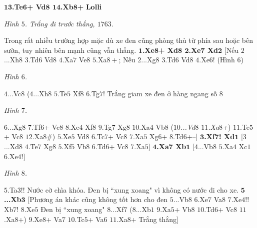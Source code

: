 \begin{multicols}{2}
	\vskip 0.1cm
	\textbf{\color{gocco}$\pmb{13}$.Te$\pmb{6}$+ Vd$\pmb{8}$ $\pmb{14}$.Xb$\pmb{8}$+}
	\vskip 0.1cm
	\textbf{\color{gocco}Lolli}
	\begin{center}
		\newgame
		\scalebox{0.85}\showboard
		\vskip 0.1cm
		\textit{\small\color{gocco}Hình $5$. Trắng đi trước thắng, $1763$.}
	\end{center}
	Trong rất nhiều trường hợp mặc dù xe đen cũng phòng thủ từ phía sau hoặc bên sườn, tuy nhiên bên mạnh cũng vẫn thắng.
	\vskip 0.1cm
	\textbf{\color{gocco}$\pmb{1}$.Xe$\pmb{8}$+ Xd$\pmb{8}$ $\pmb{2}$.Xe$\pmb{7}$ Xd$\pmb{2}$} [Nếu $2$...Xh$8$ $3$.Td$6$ Vd$8$ $4$.Xa$7$ Ve$8$ $5$.Xa$8+$; Nếu $2$...Xg$8$ $3$.Td$6$ Vd$8$ $4$.Xe$6$! (Hình $6$)
	\begin{center}
		\newgame
		\scalebox{0.85}\showboard
		\vskip 0.1cm
		\textit{\small\color{gocco}Hình $6$.}
	\end{center}
	$4$...Vc$8$ ($4$...Xh$8$ $5$.Te$5$ Xf$8$ $6$.Tg$7$! Trắng giam xe đen ở hàng ngang số $8$
	\begin{center}
		\newgame
		\scalebox{0.85}\showboard
		\vskip 0.1cm
		\textit{\small\color{gocco}Hình $7$.}
	\end{center}
	$6$...Xg$8$ $7$.Tf$6$+ Vc$8$ $8$.Xe$4$ Xf$8$ $9$.Tg$7$ Xg$8$ $10$.Xa$4$ Vb$8$ (\textit{$10$...Vd$8$ $11$.Xa$8$+}) $11$.Te$5$+ Vc$8$ $12$.Xa$8\#$) $5$.Xe$5$ Vd$8$ $6$.Tc$7$+ Vc$8$ $7$.Xa$5$ Xg$6$+ $8$.Td$6$+–]
	\vskip 0.1cm
	\textbf{\color{gocco}$\pmb{3}$.Xf$\pmb{7}$! Xd$\pmb{1}$} [$3$...Xd$8$ $4$.Te$7$ Xg$8$ $5$.Xf$5$ Vb$8$ $6$.Td$6$+ Vc$8$ $7$.Xa$5$]
	\vskip 0.1cm
	\textbf{\color{gocco}$\pmb{4}$.Xa$\pmb{7}$ Xb$\pmb{1}$} [$4$...Vb$8$ $5$.Xa$4$ Xc$1$ $6$.Xe$4$!]
	\begin{center}
		\newgame
		\scalebox{0.85}\showboard
		\vskip 0.1cm
		\textit{\small\color{gocco}Hình $8$.}
	\end{center}
	$5$.Ta$3$!! 
	\vskip 0.1cm
	Nước cờ chìa khóa. Đen bị ``xung xoang" vì không có nước đi cho xe. 
	\vskip 0.1cm
	\textbf{\color{gocco}$\pmb{5}$...Xb$\pmb{3}$} [Phương án khác cũng không tốt hơn cho đen $5$...Vb$8$ $6$.Xe$7$ Va$8$ $7$.Xe$4$!! Xb$7$! $8$.Xe$5$ 
	\vskip 0.1cm
	Đen bị ``xung xoang" $8$...Xf$7$ ($8$...Xb$1$ $9$.Xa$5$+ Vb$8$ $10$.Td$6$+ Vc$8$ $11$.Xa$8$+) $9$.Xe$8$+ Va$7$ $10$.Tc$5$+ Va$6$ $11$.Xa$8$+ Trắng thắng]
	\begin{center}
		\newgame

\end{center}
\end{multicols}
